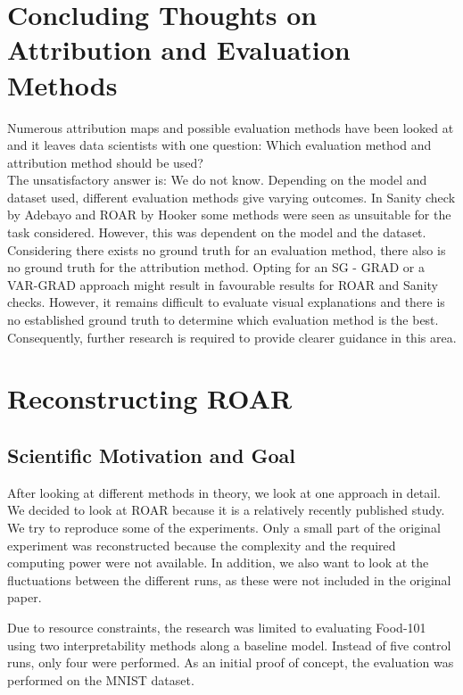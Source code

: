 \chapter{Concluding Thoughts on Attribution and Evaluation Methods}
\label{sec:summary}
Numerous attribution maps and possible evaluation methods have been looked at and it leaves data scientists with one question: Which evaluation method and attribution method should be used?
\\
The unsatisfactory answer is: We do not know. Depending on the model and dataset used, different evaluation methods give varying outcomes. In Sanity check by Adebayo \cite{adebayo2020sanity} and ROAR by Hooker\cite{hooker2019benchmark} some methods were seen as unsuitable for the task considered. However, this was dependent on the model and the dataset. Considering there exists no ground truth for an evaluation method, there also is no ground truth for the attribution method. Opting for an SG - GRAD or a VAR-GRAD approach might result in favourable results for ROAR and Sanity checks. However, it remains difficult to evaluate visual explanations and there is no established ground truth to determine which evaluation method is the best. Consequently, further research is required to provide clearer guidance in this area.

\chapter{Reconstructing ROAR} %
\label{sec:project}

\section{Scientific Motivation and Goal}

After looking at different methods in theory, we look at one approach in detail. We decided to look at ROAR\cite{hooker2019benchmark} because it is a relatively recently published study. We try to reproduce some of the experiments. Only a small part of the original experiment was reconstructed because the complexity and the required computing power were not available. In addition, we also want to look at the fluctuations between the different runs, as these were not included in the original paper.


Due to resource constraints, the research was limited to evaluating Food-101 \cite{bossard14} using two interpretability methods along a baseline model. Instead of five control runs, only four were performed. As an initial proof of concept, the evaluation was performed on the MNIST dataset\cite{deng2012mnist}.


